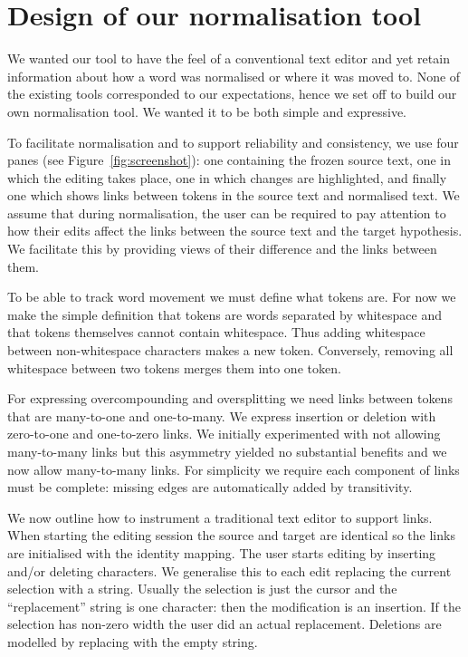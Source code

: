 \documentclass[10pt, a4paper]{article}
\newcommand{\dan}[1]{{\color{Fuchsia}{Dan: #1}}}
\newcommand{\elena}[1]{{\color{BrickRed}{Elena: #1}}}
\newcommand{\mats}[1]{{\color{Blue}{Mats: #1}}}
\begin{document}
\section{Design of our normalisation tool}
\label{sec:norm_tool}

We wanted our tool to have the feel of a conventional text editor and yet retain
information about how a word was normalised or where it was moved to. None of the existing tools corresponded to our expectations, hence we set off to build our own normalisation tool. We wanted it to be both simple and expressive.

To facilitate normalisation and to support reliability and consistency,
we use four panes (see Figure~\ref{fig:screenshot}): one containing the
frozen source text, one in which the editing takes place, one in which
changes are highlighted, and finally one which shows links between tokens in the source text and normalised text.
We assume that during normalisation, the user can be required to pay attention
to how their edits affect the links between the source text and the target
hypothesis. We facilitate this by providing views of their difference and
the links between them.

To be able to track word movement we must define what tokens are.
For now we make the simple definition that tokens are words separated
by whitespace and that tokens themselves cannot contain whitespace.
Thus adding whitespace between non-whitespace characters makes a new token.
Conversely, removing all whitespace between two tokens merges them into one token.

For expressing overcompounding and oversplitting we need links between tokens
that are many-to-one and one-to-many. We express insertion or deletion with
zero-to-one and one-to-zero links. We initially experimented with not allowing
many-to-many links but this asymmetry yielded no substantial benefits
and we now allow many-to-many links.
For simplicity we require each component
of links must be complete: missing edges are automatically added by
transitivity.

We now outline how to instrument a traditional text editor to support links.
When starting the editing session the source and target are identical so the
links are initialised with the identity mapping. The user starts editing
by inserting and/or deleting characters.
We generalise this to each edit replacing the current selection with a
string. Usually the selection is just the cursor and the ``replacement'' string
is one character: then the modification is an insertion.
If the selection has non-zero width the user did an actual replacement.
Deletions are modelled by replacing with the empty string.
\end{document}
